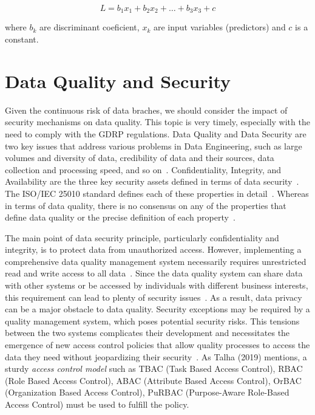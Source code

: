 \begin{equation*}
    L = b_1 x_1 + b_2 x_2 + \ldots + b_3 x_3 + c
\end{equation*}

where \( b_k \) are discriminant coeficient, \( x_k \) are input variables (predictors) and \( c \) is a constant.

\section{Data Quality and Security}

Given the continuous risk of data braches, we should consider the impact of security mechanisms on data quality.
This topic is very timely, especially with the need to comply with the GDRP regulations.
Data Quality and Data Security are two key issues that address various problems in Data Engineering, such as large volumes and diversity of data, credibility of data and their sources, data collection and processing speed, and so on~\cite{talha2019}.
Confidentiality, Integrity, and Availability are the three key security assets defined in terms of data security~\cite{talha2019}.
The ISO/IEC 25010 standard defines each of these properties in detail~\cite{iso25010}.
Whereas in terms of data quality, there is no consensus on any of the properties that define data quality or the precise definition of each property~\cite{batini2009}.

The main point of data security principle, particularly confidentiality and integrity, is to protect data from unauthorized access.
However, implementing a comprehensive data quality management system necessarily requires unrestricted read and write access to all data~\cite{talha2019}.
Since the data quality system can share data with other systems or be accessed by individuals with different business interests, this requirement can lead to plenty of security issues~\cite{talha2019}.
As a result, data privacy can be a major obstacle to data quality.
Security exceptions may be required by a quality management system, which poses potential security risks.
This tensions between the two systems complicates their development and necessitates the emergence of new access control policies that allow quality processes to access the data they need without jeopardizing their security~\cite{talha2019}.
As Talha (2019) mentions, a sturdy \textit{access control model} such as TBAC (Task Based Access Control), RBAC (Role Based Access Control), ABAC (Attribute Based Access Control), OrBAC (Organization Based Access Control), PuRBAC (Purpose-Aware Role-Based Access Control) must be used to fulfill the policy.

